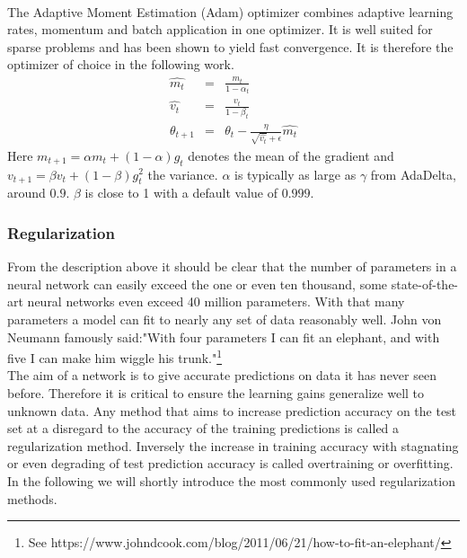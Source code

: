				~\\
				The Adaptive Moment Estimation (Adam) optimizer combines adaptive learning rates, momentum and batch application in one optimizer. It is well suited for sparse problems and has been shown to yield fast convergence. It is therefore the optimizer of choice in the following work.
				\begin{eqnarray}
					\hat{m_t} & = & \frac{m_t}{1-\alpha_t}\\
					\hat{v_t} & = & \frac{v_t}{1-\beta_t} \\
					\theta_{t+1} & = & \theta_{t} - \frac{\eta}{\sqrt{\hat{v_t}}+\epsilon}\hat{m_t}
				\end{eqnarray}
				Here $m_{t+1} = \alpha m_t + (1-\alpha)g_t$ denotes the mean of the gradient and $v_{t+1} = \beta v_t + (1-\beta)g^2_t$ the variance. $\alpha$ is typically as large as $\gamma$ from AdaDelta, around $0.9$. $\beta$ is close to 1 with a default value of $0.999$. 
			\subsubsection{Regularization}
				From the description above it should be clear that the number of parameters in a neural network can easily exceed the one or even ten thousand, some state-of-the-art neural networks even exceed 40 million parameters. With that many parameters a model can fit to nearly any set of data reasonably well. John von Neumann famously said:"With four parameters I can fit an elephant, and with five I can make him wiggle his trunk."\footnote{See https://www.johndcook.com/blog/2011/06/21/how-to-fit-an-elephant/}\\
				The aim of a network is to give accurate predictions on data it has never seen before. Therefore it is critical to ensure the learning gains generalize well to unknown data. Any method that aims to increase prediction accuracy on the test set at a disregard to the accuracy of the training predictions is called a regularization method. Inversely the increase in training accuracy with stagnating or even degrading of test prediction accuracy is called overtraining or overfitting.\\
				In the following we will shortly introduce the most commonly used regularization methods.
